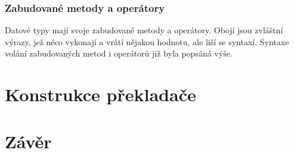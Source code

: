 \documentclass[a4paper,12pt]{article}
\begin{document}
\subsubsection{Zabudované metody a operátory}
Datové typy mají svoje zabudované metody a operátory. Obojí jsou zvláštní výrazy, jež něco vykonají a vrátí nějakou hodnotu, ale liší se syntaxí. Syntaxe volání zabudovaných metod i operátorů již byla popsáná výše.

\section{Konstrukce překladače}

\section{Závěr}

\newpage
\printbibliography[heading=bibintoc, title={Použitá literatura}]
\newpage
\end{document}

